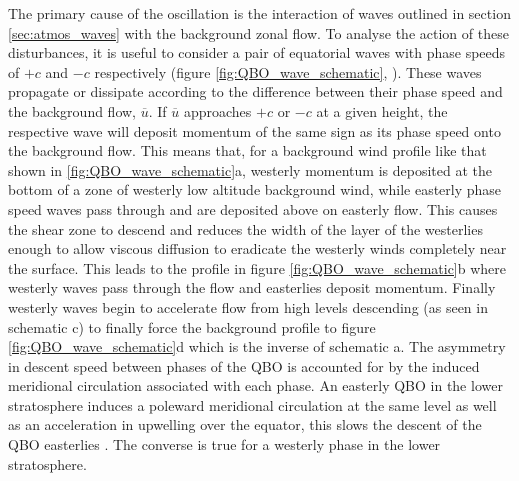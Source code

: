 The primary cause of the oscillation is the interaction of waves outlined in section \ref{sec:atmos_waves} with the background zonal flow. To analyse the action of these disturbances, it is useful to consider a pair of equatorial waves with phase speeds of $+c$ and $-c$ respectively (figure \ref{fig:QBO_wave_schematic}, \cite{plumbQuasibiennial1984}). These waves propagate or dissipate according to the difference between their phase speed and the background flow, $\overline{u}$. If $\overline{u}$ approaches $+c$ or $-c$ at a given height, the respective wave will deposit momentum of the same sign as its phase speed onto the background flow. This means that, for a background wind profile like that shown in \ref{fig:QBO_wave_schematic}a, westerly momentum is deposited at the bottom of a zone of westerly low altitude background wind, while easterly phase speed waves pass through and are deposited above on easterly flow. This causes the shear zone to descend and reduces the width of the layer of the westerlies enough to allow viscous diffusion to eradicate the westerly winds completely near the surface. This leads to the profile in figure \ref{fig:QBO_wave_schematic}b where westerly waves pass through the flow and easterlies deposit momentum. Finally westerly waves begin to accelerate flow from high levels descending (as seen in schematic c) to finally force the background profile to figure \ref{fig:QBO_wave_schematic}d which is the inverse of schematic a. The asymmetry in descent speed between phases of the QBO is accounted for by the induced meridional circulation associated with each phase. An easterly QBO in the lower stratosphere induces a poleward meridional circulation at the same level \citep{plumbQuasibiennial1984, baldwinQuasiBiennial2001} as well as an acceleration in upwelling over the equator, this slows the descent of the QBO easterlies \citep{reedQuasiBiennial1965}. The converse is true for a westerly phase in the lower stratosphere.

